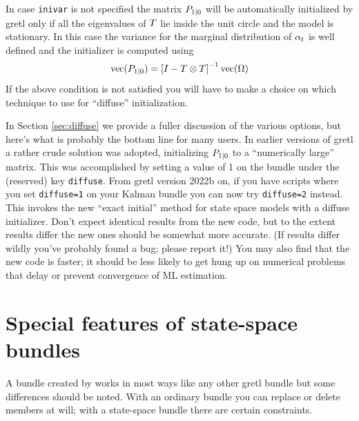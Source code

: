 In case \texttt{inivar} is not specified the matrix
$P_{1|0}$ will be automatically initialized by gretl only if
all the eigenvalues of $T$ lie inside the unit circle and the
model is stationary. In this case the variance for the marginal
distribution of $\alpha_t$ is well defined and the initializer is
computed using
\[
\mbox{vec}(P_{1|0}) = \left[ I - T \otimes T
\right]^{-1} \mbox{vec}(\Omega)
\]
If the above condition is not satisfied you will have to make a
choice on which technique to use for ``diffuse'' initialization.

In Section \ref{sec:diffuse} we provide a fuller discussion of the
various options, but here's what is probably the bottom line for many
users. In earlier versions of gretl a rather crude solution was
adopted, initializing $P_{1|0}$ to a ``numerically large''
matrix. This was accomplished by setting a value of 1 on the bundle
under the (reserved) key \texttt{diffuse}.  From gretl version 2022b
on, if you have scripts where you set \texttt{diffuse=1} on your
Kalman bundle you can now try \texttt{diffuse=2} instead. This
invokes the new ``exact initial'' method for state space models with a
diffuse initializer. Don't expect identical results from the new code,
but to the extent results differ the new ones should be somewhat more
accurate. (If results differ wildly you've probably found a bug;
please report it!) You may also find that the new code is faster; it
should be less likely to get hung up on numerical problems that delay
or prevent convergence of ML estimation.

\section{Special features of state-space bundles}
\label{sec:ss-special}

A bundle created by  works in most ways like any other
gretl bundle but some differences should be noted.  With an ordinary
bundle you can replace or delete members at will; with a state-space
bundle there are certain constraints.

